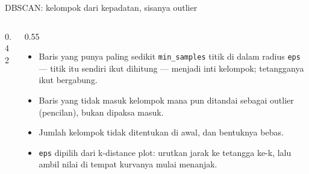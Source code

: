 \documentclass[aspectratio=169,t]{beamer}
\begin{document}
\begin{frame}{DBSCAN: kelompok dari kepadatan, sisanya outlier}
  \vspace{0.2em}
  \begin{columns}[T]
    \begin{column}{0.42\textwidth}
      \begin{center}
      \end{center}
    \end{column}
    \begin{column}{0.55\textwidth}
      \vspace{0.2em}
      \begin{itemize}\setlength\itemsep{0.3em}
        \item Baris yang punya paling sedikit \texttt{min\_samples} titik di dalam radius
              \texttt{eps} --- titik itu sendiri ikut dihitung --- menjadi inti kelompok;
              tetangganya ikut bergabung.
        \item Baris yang tidak masuk kelompok mana pun ditandai sebagai outlier (pencilan),
              bukan dipaksa masuk.
        \item Jumlah kelompok tidak ditentukan di awal, dan bentuknya bebas.
        \item \texttt{eps} dipilih dari k-distance plot: urutkan jarak ke tetangga ke-k, lalu
              ambil nilai di tempat kurvanya mulai menanjak.
      \end{itemize}
    \end{column}
  \end{columns}
\end{frame}
\end{document}
